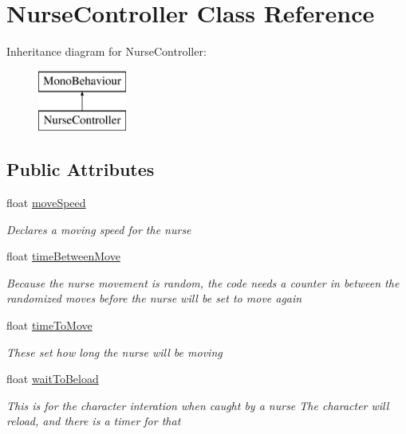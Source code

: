 \hypertarget{class_nurse_controller}{}\section{Nurse\+Controller Class Reference}
\label{class_nurse_controller}
Inheritance diagram for Nurse\+Controller\+:\begin{figure}[H]
\begin{center}
\leavevmode
\includegraphics[height=2.000000cm]{class_nurse_controller}
\end{center}
\end{figure}
\subsection*{Public Attributes}
\begin{DoxyCompactItemize}
\item 
float \mbox{\hyperlink{class_nurse_controller_ac322ce98930aa447581ed2f996afa236}{move\+Speed}}
\begin{DoxyCompactList}\small\item\em Declares a moving speed for the nurse \end{DoxyCompactList}\item 
float \mbox{\hyperlink{class_nurse_controller_a2c526e24198abadb85a44b92c46a2fed}{time\+Between\+Move}}
\begin{DoxyCompactList}\small\item\em Because the nurse movement is random, the code needs a counter in between the randomized moves before the nurse will be set to move again \end{DoxyCompactList}\item 
float \mbox{\hyperlink{class_nurse_controller_a8d3c0f3a1e8e1b2082e98926c1e6ede6}{time\+To\+Move}}
\begin{DoxyCompactList}\small\item\em These set how long the nurse will be moving \end{DoxyCompactList}\item 
float \mbox{\hyperlink{class_nurse_controller_a75b6d8fbe22de1d605aff154528d9827}{wait\+To\+Beload}}
\begin{DoxyCompactList}\small\item\em This is for the character interation when caught by a nurse The character will reload, and there is a timer for that \end{DoxyCompactList}\end{DoxyCompactItemize}
